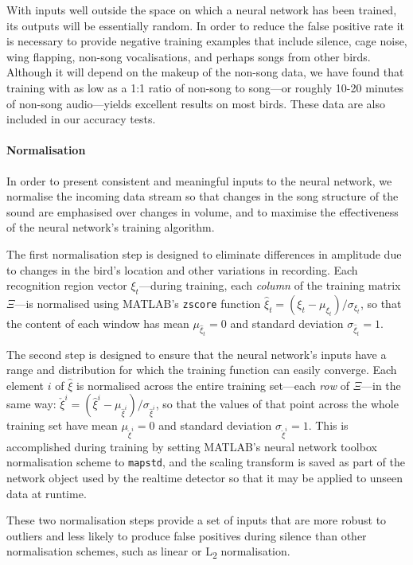 \documentclass[10pt,letterpaper]{article}
\renewcommand{\subsubsection}[1]{\paragraph{#1}}
\begin{document}
With inputs well outside the space on which a neural network has been
trained, its outputs will be essentially random. In order to reduce
the false positive rate it is necessary to provide negative training
examples that include silence, cage noise, wing flapping, non-song
vocalisations, and perhaps songs from other birds.  Although it will
depend on the makeup of the non-song data, we have found that training
with as low as a 1:1 ratio of non-song to song---or roughly 10-20
minutes of non-song audio---yields excellent results on most birds.
These data are also included in our accuracy tests.


\subsubsection{Normalisation}

In order to present consistent and meaningful inputs to the neural
network, we normalise the incoming data stream so that changes in the
song structure of the sound are emphasised over changes in volume, and
to maximise the effectiveness of the neural network's training
algorithm.

The first normalisation step is designed to eliminate differences in
amplitude due to changes in the bird's location and other variations
in recording.  Each recognition region vector $\xi_t$---during
training, each {\em column} of the training matrix $\Xi$---is
normalised using MATLAB's {\tt zscore} function $\hat{\xi}_t = (\xi_t
- \mu_{\xi_t}) / \sigma_{\xi_t}$, so that the content of each window
has mean $\mu_{\hat{\xi}_t}=0$ and standard deviation
$\sigma_{\hat{\xi}_t}=1$.

The second step is designed to ensure that the neural network's inputs
have a range and distribution for which the training function can
easily converge.  Each element $i$ of $\hat{\xi}$ is normalised across
the entire training set---each {\em row} of $\Xi$---in the same way:
$\check{\xi}^i = (\hat{\xi}^i -
\mu_{\hat{\xi}^i})/\sigma_{\hat{\xi}^i}$, so that the values of that
point across the whole training set have mean $\mu_{\check{\xi}^i}=0$
and standard deviation $\sigma_{\check{\xi}^i}=1$.  This is
accomplished during training by setting MATLAB's neural network
toolbox normalisation scheme to {\tt mapstd}, and the scaling
transform is saved as part of the network object used by the realtime
detector so that it may be applied to unseen data at runtime.

These two normalisation steps provide a set of inputs that are more
robust to outliers and less likely to produce false positives during
silence than other normalisation schemes, such as linear or
L\textsubscript{2} normalisation.
\end{document}
